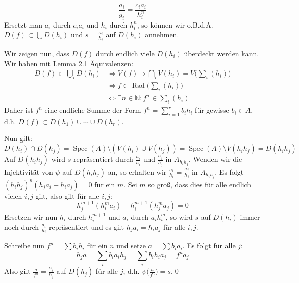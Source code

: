 \begin{enumerate}[(i)]
\begin{itemize}
\[\frac{a_i}{g_i}=\frac{c_ia_i}{h_i^n}\]
Ersetzt man $a_i$ durch $c_ia_i$ und $h_i$ durch $h_i^n$, so können wir o.B.d.A. $D(f)\subset\bigcup D(h_i)$ und $s=\frac{a_i}{h_i}$ auf $D(h_i)$ annehmen.

Wir zeigen nun, dass $D(f)$ durch endlich viele $D(h_i)$ überdeckt werden kann. Wir haben mit \hyperref[2.1]{Lemma 2.1} Äquivalenzen:
\begin{align*}
D(f)\subset \bigcup_{i}D(h_i) &\iff V(f)\supset\bigcap_i V(h_i) = V\Big(\sum_i (h_i)\Big)\\
&\iff f\in\operatorname{Rad}\Big(\sum_i (h_i)\Big)\\
&\iff \exists n\in\mathbb{N}\colon f^n\in\sum_i (h_i)
\end{align*}
Daher ist $f^n$ eine endliche Summe der Form $f^n=\sum_{i=1}^r b_ih_i$ für gewisse $b_i\in A$, d.h. $D(f)\subset D(h_1)\cup\cdots\cup D(h_r)$.

Nun gilt: \[D(h_i)\cap D(h_j)=\operatorname{Spec}(A)\setminus (V(h_i)\cup V(h_j))=\operatorname{Spec}(A)\setminus V(h_ih_j)=D(h_ih_j)\]
Auf $D(h_ih_j)$ wird $s$ repräsentiert durch $\frac{a_i}{h_i}$ und $\frac{a_j}{h_j}$ in $A_{h_ih_j}$. Wenden wir die Injektivität von $\psi$ auf $D(h_ih_j)$ an, so erhalten wir $\frac{a_i}{h_i}=\frac{a_j}{h_j}$ in $A_{h_ih_j}$. Es folgt $(h_ih_j)^n(h_ja_i-h_ia_j)=0$ für ein $m$. Sei $m$ so groß, dass dies für alle endlich vielen $i,j$ gilt, also gilt für alle $i,j$:
\[h_j^{m+1}(h_i^ma_i)-h_i^{m+1}(h_j^ma_j)=0 \]
Ersetzen wir nun $h_i$ durch $h_i^{m+1}$ und $a_i$ durch $a_ih_i^m$, so wird $s$ auf $D(h_i)$ immer noch durch $\frac{a_i}{h_i}$ repräsentiert und es gilt $h_ja_i=h_ia_j$ für alle $i,j$.

Schreibe nun $f^n=\sum b_ih_i$ für ein $n$ und setze $a=\sum b_ia_i$. Es folgt für alle $j$:
\[h_ja = \sum_i b_ia_ih_j=\sum _i b_ih_ia_j=f^na_j \]
Also gilt $\frac{a}{f^n}=\frac{a_j}{h_j}$ auf $D(h_j)$ für alle $j$, d.h. $\psi\big(\frac{a}{f^n}\big)=s$.\qed
\end{itemize}
\end{enumerate}

